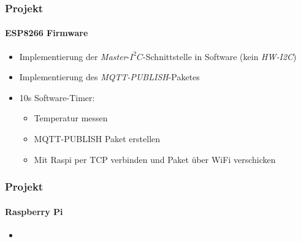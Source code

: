 \documentclass{beamer}
\begin{document}
\begin{frame}

\frametitle{Projekt}
\framesubtitle{ESP8266 Firmware}
\begin{itemize}
	\item Implementierung der \textit{Master}-$I^2C$-Schnittstelle in Software (kein \textit{HW-I2C})
	\item Implementierung des \textit{MQTT-PUBLISH}-Paketes
	\item 10s Software-Timer:
	\begin{itemize}
		\item Temperatur messen
		\item MQTT-PUBLISH Paket erstellen
		\item Mit Raspi per TCP verbinden und Paket über WiFi verschicken
	\end{itemize}
\end{itemize}

\end{frame}

\begin{frame}

\frametitle{Projekt}
\framesubtitle{Raspberry Pi}
\begin{itemize}
	\item 
\end{itemize}

\end{frame}


\end{document}
